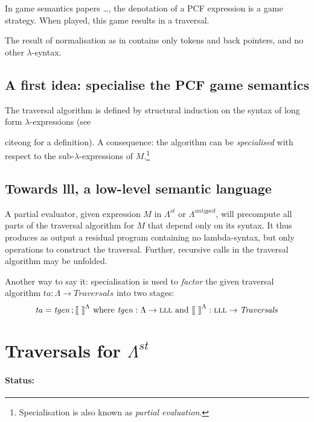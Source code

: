 \documentclass{llncs}
\begin{document}
In game semantics papers \cite{ong}\ldots, the denotation of a PCF expression is  a game strategy. When played, 
this game results in a traversal.

The result of normalisation as in \cite{ong} contains only tokens and back pointers, and no other  $\lambda$-syntax.



\subsection{A first  idea: specialise the PCF game semantics}



The traversal algorithm is defined by structural induction on the syntax of long form $\lambda$-expressions
(see {cite{ong} for a definition). 
A consequence: the algorithm can be {\em specialised} with respect to the sub-$\lambda$-expressions of 
$M$.\footnote{Specialisation is also known as {\em partial evaluation}.}



\subsection{Towards {\sc lll}, a low-level semantic language}



A partial evaluator, given expression $M$ in $\Lambda^{st}$ or $\Lambda^{untyped}$, will precompute all parts of the traversal algorithm for $M$ that depend only on its syntax. It thus produces as output a residual program containing no lambda-syntax, but only operations to construct the traversal. Further, recursive calls in the traversal algorithm may be unfolded.

Another way to say it: specialisation is used to {\em factor} the given traversal algorithm
$ \mathit{ta} : \Lambda \to \mathit{Traversals}$ into two stages:
$$
 \mathit{ta} = \mathit{tgen}\, ; \mbox{$\lbrack\hspace{-0.3ex}\lbrack$}\ \mbox{$\rbrack\hspace{-0.3ex}\rbrack$}^\Lambda 
 \mbox{\ where\  }  
       \mathit{tgen}:\Lambda \to \mbox{\sc lll} 
 \mbox{\ and\ }
 \mbox{$\lbrack\hspace{-0.3ex}\lbrack$}\ \mbox{$\rbrack\hspace{-0.3ex}\rbrack$}^\Lambda : \mbox{\sc lll} \to \mathit{Traversals}
$$

\section{Traversals for $\Lambda^{st}$}

\paragraph{Status:} \hfill

}
\end{document}
